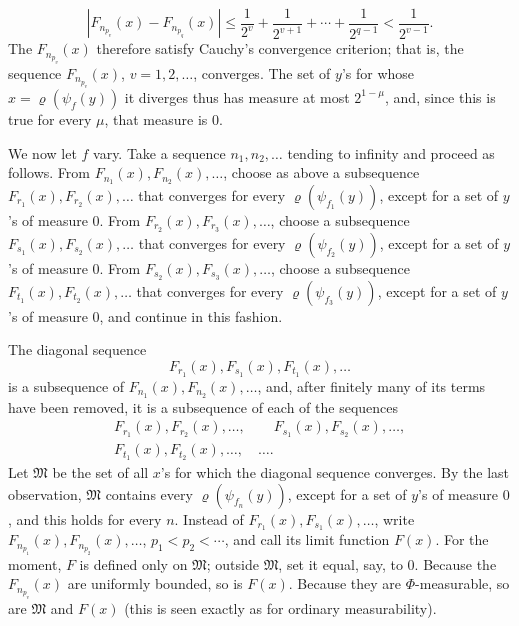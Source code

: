 \documentclass[12pt,b5paper,twoside]{article}
\begin{document}
\[
 |F_{n_{p_v}}(x)-F_{n_{p_q}}(x)|
 \leq\frac1{2^v}+\frac1{2^{v+1}}+\cdots+\frac1{2^{q-1}}
 <\frac1{2^{v-1}}.
\]
The \(F_{n_{p_v}}(x)\) therefore satisfy Cauchy's convergence criterion;
that is, the sequence \(F_{n_{p_v}}(x)\), \(v=1,2,\ldots\), converges.
The set of \(y\)'s for whose \(x=\varrho(\psi_f(y))\) it diverges thus has
measure at most \(2^{1-\mu}\), and, since this is true for every \(\mu\),
that measure is \(0\).

We now let \(f\) vary.  Take a sequence \(n_1,n_2,\ldots\) tending to
infinity and proceed as follows.  From
\(F_{n_1}(x),F_{n_2}(x),\ldots\), choose as above a subsequence
\(F_{r_1}(x),F_{r_2}(x),\ldots\) that converges for every
\(\varrho(\psi_{f_1}(y))\), except for a set of \(y\)'s of measure \(0\).
From \(F_{r_2}(x),F_{r_3}(x),\ldots\), choose a subsequence
\(F_{s_1}(x),F_{s_2}(x),\ldots\) that converges for every
\(\varrho(\psi_{f_2}(y))\), except for a set of \(y\)'s of measure \(0\).
From \(F_{s_2}(x),F_{s_3}(x),\ldots\), choose a subsequence
\(F_{t_1}(x),F_{t_2}(x),\ldots\) that converges for every
\(\varrho(\psi_{f_3}(y))\), except for a set of \(y\)'s of measure \(0\),
and continue in this fashion.

The diagonal sequence
\[
 F_{r_1}(x),F_{s_1}(x),F_{t_1}(x),\ldots
\]
is a subsequence of \(F_{n_1}(x),F_{n_2}(x),\ldots\), and, after finitely
many of its terms have been removed, it is a subsequence of each of the
sequences
\[
 \begin{gathered}
 F_{r_1}(x),F_{r_2}(x),\ldots,\qquad
 F_{s_1}(x),F_{s_2}(x),\ldots,\\
 F_{t_1}(x),F_{t_2}(x),\ldots,\quad\ldots.
 \end{gathered}
\]
Let \(\mathfrak M\) be the set of all \(x\)'s for which the diagonal
sequence converges.  By the last observation, \(\mathfrak M\) contains
every \(\varrho(\psi_{f_n}(y))\), except for a set of \(y\)'s of measure
\(0\), and this holds for every \(n\).  Instead of
\(F_{r_1}(x),F_{s_1}(x),\ldots\), write
\(F_{n_{p_1}}(x),F_{n_{p_2}}(x),\ldots\), \(p_1<p_2<\cdots\), and call
its limit function \(F(x)\).  For the moment, \(F\) is defined only on
\(\mathfrak M\); outside \(\mathfrak M\), set it equal, say, to \(0\).
Because the \(F_{n_{p_v}}(x)\) are uniformly bounded, so is \(F(x)\).
Because they are \(\Phi\)-measurable, so are \(\mathfrak M\) and \(F(x)\)
(this is seen exactly as for ordinary measurability).
\end{document}

